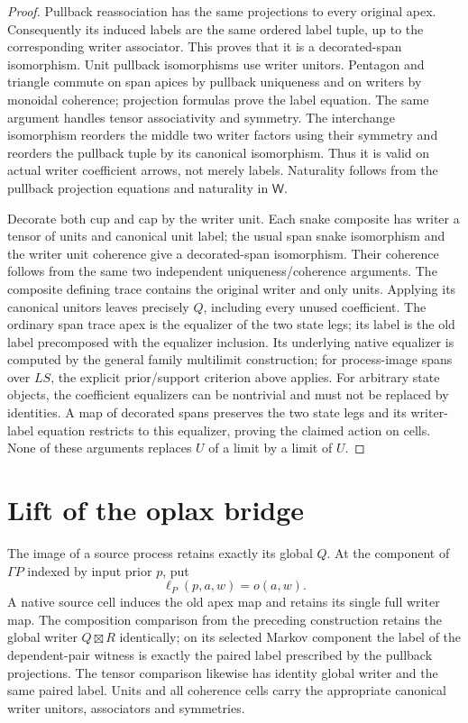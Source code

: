 \documentclass[11pt]{article}
\begin{document}
\begin{proof}
Pullback reassociation has the same projections to every original apex. Consequently its induced labels are the same ordered label tuple, up to the corresponding writer associator. This proves that it is a decorated-span isomorphism. Unit pullback isomorphisms use writer unitors. Pentagon and triangle commute on span apices by pullback uniqueness and on writers by monoidal coherence; projection formulas prove the label equation. The same argument handles tensor associativity and symmetry. The interchange isomorphism reorders the middle two writer factors using their symmetry and reorders the pullback tuple by its canonical isomorphism. Thus it is valid on actual writer coefficient arrows, not merely labels. Naturality follows from the pullback projection equations and naturality in $\mathsf W$.

Decorate both cup and cap by the writer unit. Each snake composite has writer a tensor of units and canonical unit label; the usual span snake isomorphism and the writer unit coherence give a decorated-span isomorphism. Their coherence follows from the same two independent uniqueness/coherence arguments. The composite defining trace contains the original writer and only units. Applying its canonical unitors leaves precisely $Q$, including every unused coefficient. The ordinary span trace apex is the equalizer of the two state legs; its label is the old label precomposed with the equalizer inclusion. Its underlying native equalizer is computed by the general family multilimit construction; for process-image spans over $LS$, the explicit prior/support criterion above applies. For arbitrary state objects, the coefficient equalizers can be nontrivial and must not be replaced by identities. A map of decorated spans preserves the two state legs and its writer-label equation restricts to this equalizer, proving the claimed action on cells. None of these arguments replaces $U$ of a limit by a limit of $U$.
\end{proof}

\section{Lift of the oplax bridge}
The image of a source process retains exactly its global $Q$. At the component of $\Gamma P$ indexed by input prior $p$, put
\[
 \ell_P(p,a,w)=o(a,w).
\]
A native source cell induces the old apex map and retains its single full writer map. The composition comparison from the preceding construction retains the global writer $Q\boxtimes R$ identically; on its selected Markov component the label of the dependent-pair witness is exactly the paired label prescribed by the pullback projections. The tensor comparison likewise has identity global writer and the same paired label. Units and all coherence cells carry the appropriate canonical writer unitors, associators and symmetries.
\end{document}
